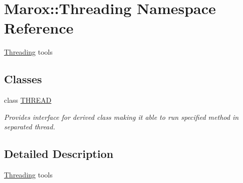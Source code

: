 \hypertarget{namespace_marox_1_1_threading}{}\section{Marox\+:\+:Threading Namespace Reference}
\label{namespace_marox_1_1_threading}


\hyperlink{namespace_marox_1_1_threading}{Threading} tools  


\subsection*{Classes}
\begin{DoxyCompactItemize}
\item 
class \hyperlink{class_marox_1_1_threading_1_1_t_h_r_e_a_d}{T\+H\+R\+E\+A\+D}
\begin{DoxyCompactList}\small\item\em Provides interface for derived class making it able to run specified method in separated thread. \end{DoxyCompactList}\end{DoxyCompactItemize}


\subsection{Detailed Description}
\hyperlink{namespace_marox_1_1_threading}{Threading} tools 

